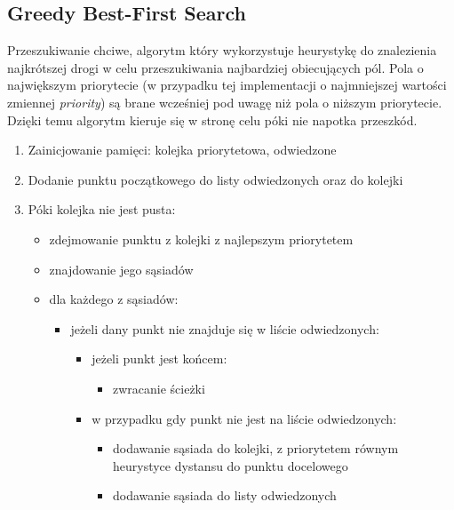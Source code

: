 \documentclass{article}
\begin{document}
\subsection{Greedy Best-First Search}
Przeszukiwanie chciwe, algorytm który wykorzystuje heurystykę do znalezienia najkrótszej drogi w celu przeszukiwania najbardziej obiecujących pól. Pola o największym priorytecie (w przypadku tej implementacji o najmniejszej wartości zmiennej \textit{priority}) są brane wcześniej pod uwagę niż pola o niższym priorytecie. Dzięki temu algorytm kieruje się w stronę celu póki nie napotka przeszkód.
\begin{enumerate}
\item Zainicjowanie pamięci: kolejka priorytetowa, odwiedzone
\item Dodanie punktu początkowego do listy odwiedzonych oraz do kolejki
\item Póki kolejka nie jest pusta:
	\begin{itemize}
	\item zdejmowanie punktu z kolejki z najlepszym priorytetem
	\item znajdowanie jego sąsiadów
	\item dla każdego z sąsiadów:
	\begin{itemize}
		\item jeżeli dany punkt nie znajduje się w liście odwiedzonych:
			\begin{itemize}
			\item jeżeli punkt jest końcem:
				\begin{itemize}
				\item zwracanie ścieżki
				\end{itemize}
			\item w przypadku gdy punkt nie jest na liście odwiedzonych:
				\begin{itemize}
				\item dodawanie sąsiada do kolejki, z priorytetem równym heurystyce dystansu do punktu docelowego
				\item dodawanie sąsiada do listy odwiedzonych				
				\end{itemize}
			\end{itemize}
		\end{itemize}		
	\end{itemize}
\end{enumerate}
\end{document}
